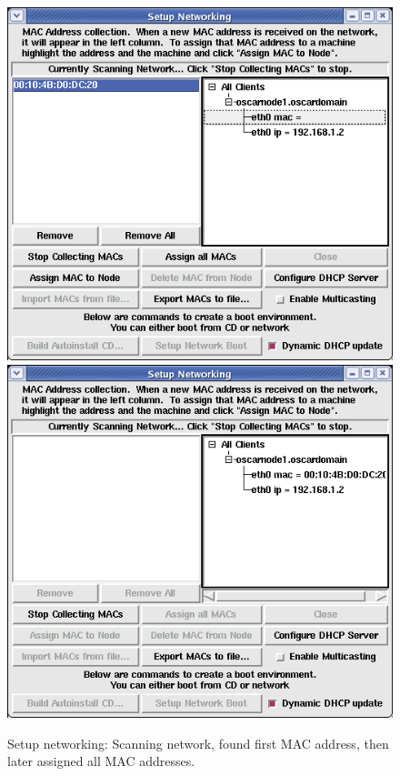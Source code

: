 \begin{figure}[!ht]
  \begin{center}
    \centerline{
      \includegraphics[scale=\imgscale]{figs/6e_sbs-found-mac}
      \hspace{\imghskip}
      \includegraphics[scale=\imgscale]{figs/6f_sbs-stop-collect-mac2}
    }
    \caption[Setup networking: Assigning MACs to IPs]{Setup
      networking: Scanning network, found first MAC address, then
      later assigned all MAC addresses.}
    \label{fig:sbs-setup-network2}
  \end{center}
\end{figure}

